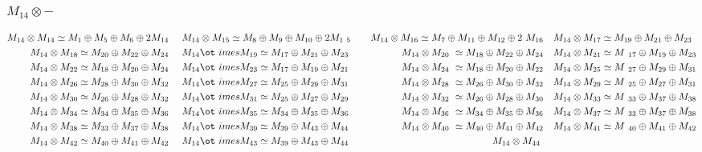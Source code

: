 \subsubsection{$M_14\otimes -$}
\begin{align*}
M_{14} \otimes M_{14} \simeq M_{1} \oplus M_{5} \oplus M_{6} \oplus 2 M_{14} &\
&& M_{14} \otimes M_{15} \simeq M_{8} \oplus M_{9} \oplus M_{10} \oplus 2 M_{1\
5} &&& M_{14} \otimes M_{16} \simeq M_{7} \oplus M_{11} \oplus M_{12} \oplus 2\
 M_{16} &&& M_{14} \otimes M_{17} \simeq M_{19} \oplus M_{21} \oplus M_{23}\\
M_{14} \otimes M_{18} \simeq M_{20} \oplus M_{22} \oplus M_{24} &&& M_{14} \ot\
imes M_{19} \simeq M_{17} \oplus M_{21} \oplus M_{23} &&& M_{14} \otimes M_{20\
} \simeq M_{18} \oplus M_{22} \oplus M_{24} &&& M_{14} \otimes M_{21} \simeq M\
_{17} \oplus M_{19} \oplus M_{23}\\
M_{14} \otimes M_{22} \simeq M_{18} \oplus M_{20} \oplus M_{24} &&& M_{14} \ot\
imes M_{23} \simeq M_{17} \oplus M_{19} \oplus M_{21} &&& M_{14} \otimes M_{24\
} \simeq M_{18} \oplus M_{20} \oplus M_{22} &&& M_{14} \otimes M_{25} \simeq M\
_{27} \oplus M_{29} \oplus M_{31}\\
M_{14} \otimes M_{26} \simeq M_{28} \oplus M_{30} \oplus M_{32} &&& M_{14} \ot\
imes M_{27} \simeq M_{25} \oplus M_{29} \oplus M_{31} &&& M_{14} \otimes M_{28\
} \simeq M_{26} \oplus M_{30} \oplus M_{32} &&& M_{14} \otimes M_{29} \simeq M\
_{25} \oplus M_{27} \oplus M_{31}\\
M_{14} \otimes M_{30} \simeq M_{26} \oplus M_{28} \oplus M_{32} &&& M_{14} \ot\
imes M_{31} \simeq M_{25} \oplus M_{27} \oplus M_{29} &&& M_{14} \otimes M_{32\
} \simeq M_{26} \oplus M_{28} \oplus M_{30} &&& M_{14} \otimes M_{33} \simeq M\
_{33} \oplus M_{37} \oplus M_{38}\\
M_{14} \otimes M_{34} \simeq M_{34} \oplus M_{35} \oplus M_{36} &&& M_{14} \ot\
imes M_{35} \simeq M_{34} \oplus M_{35} \oplus M_{36} &&& M_{14} \otimes M_{36\
} \simeq M_{34} \oplus M_{35} \oplus M_{36} &&& M_{14} \otimes M_{37} \simeq M\
_{33} \oplus M_{37} \oplus M_{38}\\
M_{14} \otimes M_{38} \simeq M_{33} \oplus M_{37} \oplus M_{38} &&& M_{14} \ot\
imes M_{39} \simeq M_{39} \oplus M_{43} \oplus M_{44} &&& M_{14} \otimes M_{40\
} \simeq M_{40} \oplus M_{41} \oplus M_{42} &&& M_{14} \otimes M_{41} \simeq M\
_{40} \oplus M_{41} \oplus M_{42}\\
M_{14} \otimes M_{42} \simeq M_{40} \oplus M_{41} \oplus M_{42} &&& M_{14} \ot\
imes M_{43} \simeq M_{39} \oplus M_{43} \oplus M_{44} &&& M_{14} \otimes M_{44\
}
\end{align*}
